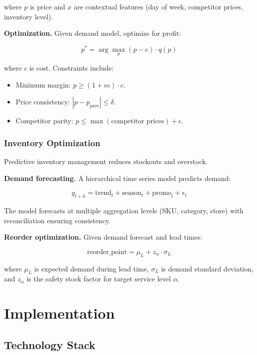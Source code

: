 \documentclass[11pt,twocolumn]{article}
\begin{document}
where $p$ is price and $x$ are contextual features (day of week, competitor prices, inventory level).

\textbf{Optimization.} Given demand model, optimize for profit:

\begin{equation}
p^* = \arg\max_p (p - c) \cdot q(p)
\end{equation}

where $c$ is cost. Constraints include:
\begin{itemize}
\item Minimum margin: $p \geq (1 + m) \cdot c$.
\item Price consistency: $|p - p_{\text{prev}}| \leq \delta$.
\item Competitor parity: $p \leq \max(\text{competitor prices}) + \epsilon$.
\end{itemize}

\subsubsection{Inventory Optimization}

Predictive inventory management reduces stockouts and overstock.

\textbf{Demand forecasting.} A hierarchical time series model \cite{hyndman2011} predicts demand:

\begin{equation}
y_{t+h} = \text{trend}_t + \text{season}_t + \text{promo}_t + \epsilon_t
\end{equation}

The model forecasts at multiple aggregation levels (SKU, category, store) with reconciliation ensuring consistency.

\textbf{Reorder optimization.} Given demand forecast and lead times:

\begin{equation}
\text{reorder\_point} = \mu_L + z_\alpha \cdot \sigma_L
\end{equation}

where $\mu_L$ is expected demand during lead time, $\sigma_L$ is demand standard deviation, and $z_\alpha$ is the safety stock factor for target service level $\alpha$.

\section{Implementation}

\subsection{Technology Stack}
\end{document}
